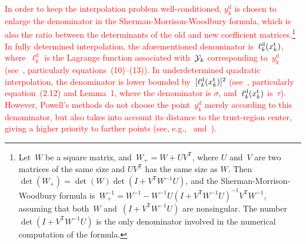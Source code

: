 \documentclass[
    smallextended,  %
    draft,          %
]{svjour3}
\newcommand{\T}{\mathsf{T}}
\newcommand{\drop}{{\text{d}}}
\newcommand{\iter}[1][k]{x\ifthenelse{\equal{#1}{}}{}{_{#1}}}
\newcommand{\trust}{{\text{t}}}
\newcommand{\xpt}[1][k]{\mathcal{Y}\ifthenelse{\equal{#1}{}}{}{_{#1}}}
\newcommand{\red}{\textcolor{red}}
\begin{document}
\red{
In order to keep the interpolation problem well-conditioned, $y_k^{\drop}$ is chosen
to enlarge the denominator in the Sherman-Morrison-Woodbury formula, which is also the ratio between
the determinants of the old and new coefficient matrices.\footnote{
    Let~$W$ be a square matrix, and~$W_+ = W + UV^\T$, where $U$ and~$V$ are two
    matrices of the same size and $UV^\T$ has the same size as $W$.
    Then~$\det(W_+) = \det(W)\det(I+V^\T W^{-1}U)$, and the
    Sherman-Morrison-Woodbury formula
    is~$W_+^{-1} = W^{-1} -W^{-1}U(I+V^\T W^{-1}U)^{-1} V^\T W^{-1}$, assuming that both~$W$
    and~$(I+V^\T W^{-1}U)$ are nonsingular. The number~$\det(I+V^\T W^{-1}U)$ is the only
    denominator involved in the numerical computation of the formula.
}
In fully determined interpolation, the aforementioned denominator is~$\ell_k^\drop(\iter^{\trust})$, where~$\ell_k^\drop$ is the Lagrange function associated with~$\xpt$ corresponding to~$y_k^\drop$
(see~\mbox{\cite[\S~2]{Powell_2001}}, particularly equations~(10)--(13)).
In underdetermined quadratic interpolation, the denominator is lower
bounded by~$[\ell_k^{\drop}(\iter^{\trust})]^2$ (see~\mbox{\cite[\S~2]{Powell_2004c}}, particularly
equation~(2.12) and Lemma~1, where the denominator is $\sigma$, and~$\ell_k^{\drop}(\iter^{\trust})$
is~$\tau$).
However, Powell's methods do not choose the point~$y_k^\drop$ merely according to this denominator, but also
takes into account its distance to the trust-region center, giving a higher priority to farther
points (see, e.g.,~\cite[equation~(56)]{Powell_2002} and~\cite[equations~(7.4)--(7.5)]{Powell_2006}).
}
\end{document}
